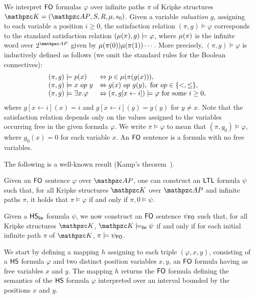 We interpret $\text{\sffamily FO}$ formulas $\varphi$ over infinite paths $\pi$ of Kripke structures $\Ku=\KuDef$. 
Given a variable \emph{valuation} $g$, assigning to each variable  a position $i\geq 0$,  the satisfaction relation
$(\pi,g)\models \varphi$ corresponds to the standard satisfaction relation $(\mu(\pi),g)\models \varphi$, where $\mu(\pi)$ is the infinite word over $2^{\Prop}$ given by $\mu(\pi(0))\mu(\pi(1))\cdots$. 
More precisely, 
$(\pi,g)\models \varphi$ is inductively defined as follows
 (we omit the standard rules for the Boolean connectives):
\[
\begin{array}{ll}
 (\pi,g)\models p(x) & \Leftrightarrow  p \in \mu(\pi(g(x))),\\
 (\pi,g)\models x\ op\ y & \Leftrightarrow  g(x)\ op\ g(y), \mbox{ for } op \in \{<, \leq\},\\
   (\pi,g)\models \exists x. \varphi & \Leftrightarrow  (\pi,g[x\leftarrow i])\models \varphi \text{ for some } i\geq 0 ,
\end{array}
\]
where $g[x\leftarrow i](x)=i$ and $g[x\leftarrow i](y)=g(y)$ for $y\neq x$. Note that the satisfaction relation  depends only on the values assigned to the variables occurring free in the given formula $\varphi$.
We write $\pi\models \varphi$ to mean that $(\pi,g_0)\models \varphi$, where $g_0(x)=0$ for each variable $x$. An $\text{\sffamily FO}$ sentence is a formula with no free variables.  

The following is a well-known result (Kamp's theorem~\cite{Kamp}).

\begin{proposition}\label{theo:FromFOtoLTL} Given an $\text{\sffamily FO}$ sentence $\varphi$ over $\Prop$, one can construct an $\text{\sffamily LTL}$ formula $\psi$ such that, for all Kripke structures $\Ku$ over $\Prop$ and infinite paths $\pi$, it holds that
$\pi \models \varphi$ if and only if $\pi,0\models \psi$.
\end{proposition}

Given a $\text{\sffamily HS}_{\mathsf{lin}}$ formula $\psi$, we now construct  an 
$\text{\sffamily FO}$ sentence $\psi_{\text{\sffamily FO}}$ such that, for all Kripke structures $\Ku$, 
$\Ku\models_\LinearTime \psi$ if and only if for each initial infinite path $\pi$ of $\Ku$, $\pi\models \psi_{\text{\sffamily FO}}$.

We start by defining a mapping $h$ assigning to each triple $(\varphi,x,y)$, consisting of a $\text{\sffamily HS}$ formula $\varphi$ and two distinct position variables $x,y$, an $\text{\sffamily FO}$ formula having as free variables $x$ and $y$.
The mapping $h$ returns the $\text{\sffamily FO}$ formula defining the semantics of the $\text{\sffamily HS}$ formula $\varphi$ interpreted over an interval bounded by the positions $x$ and $y$. 
 
